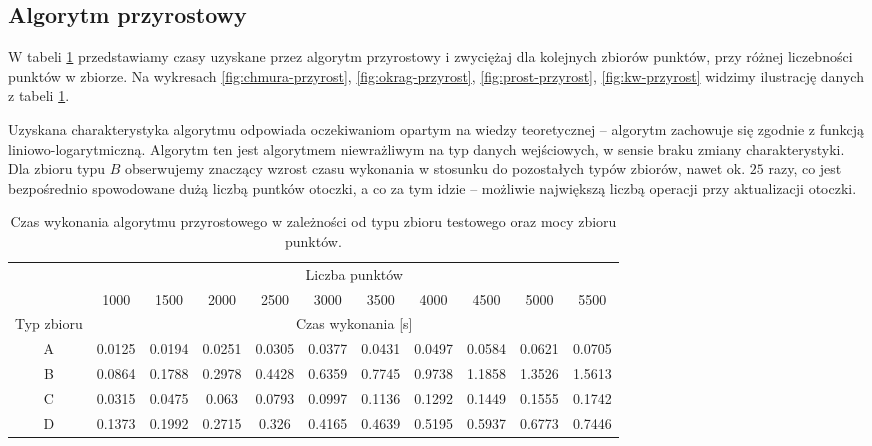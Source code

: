 \documentclass[11pt]{article}
\theoremstyle{remark} \newtheorem{definition}{def.}
\theoremstyle{definition} \newtheorem{twierdzenie}{tw.}
\begin{document}
\subsection{Algorytm przyrostowy}


W tabeli \ref{tab:przyrost} przedstawiamy czasy uzyskane przez algorytm przyrostowy i zwyciężaj dla kolejnych zbiorów punktów, przy różnej liczebności punktów w zbiorze. Na wykresach \ref{fig:chmura-przyrost}, 
\ref{fig:okrag-przyrost}, \ref{fig:prost-przyrost}, \ref{fig:kw-przyrost} widzimy ilustrację danych z tabeli \ref{tab:przyrost}.


Uzyskana charakterystyka algorytmu odpowiada oczekiwaniom opartym na wiedzy teoretycznej -- algorytm zachowuje się zgodnie z funkcją liniowo-logarytmiczną. 
Algorytm ten jest algorytmem niewrażliwym na typ danych wejściowych, w sensie braku zmiany charakterystyki. Dla zbioru typu
$B$ obserwujemy znaczący wzrost czasu wykonania w stosunku do pozostałych typów zbiorów, nawet ok. $25$ razy, co jest bezpośrednio spowodowane dużą liczbą puntków otoczki, a co za tym idzie -- możliwie 
największą liczbą operacji przy aktualizacji otoczki. 


\begin{table}[]
\centering
\caption{Czas wykonania algorytmu przyrostowego w zależności od typu zbioru testowego oraz mocy zbioru punktów.}
\label{tab:przyrost}
\begin{tabular}{c|c|c|c|c|c|c|c|c|c|c|}
\cline{2-11}
\multicolumn{1}{l|}{} & \multicolumn{10}{c|}{Liczba punktów} \\ \cline{2-11} 
\multicolumn{1}{l|}{} & 1000 & 1500 & 2000 & 2500 & 3000 & 3500 & 4000 & 4500 & 5000 & 5500 \\ \hline
\multicolumn{1}{|c|}{Typ zbioru} & \multicolumn{10}{c|}{Czas wykonania {[}s{]}} \\ \hline
\multicolumn{1}{|c|}{A} & 0.0125 & 0.0194 & 0.0251 & 0.0305 & 0.0377 & 0.0431 & 0.0497 & 0.0584 & 0.0621 & 0.0705 \\ \hline
\multicolumn{1}{|c|}{B} & 0.0864 & 0.1788 & 0.2978 & 0.4428 & 0.6359 & 0.7745 & 0.9738 & 1.1858 & 1.3526 & 1.5613 \\ \hline
\multicolumn{1}{|c|}{C} & 0.0315 & 0.0475 & 0.063 & 0.0793 & 0.0997 & 0.1136 & 0.1292 & 0.1449 & 0.1555 & 0.1742 \\ \hline
\multicolumn{1}{|c|}{D} & 0.1373 & 0.1992 & 0.2715 & 0.326 & 0.4165 & 0.4639 & 0.5195 & 0.5937 & 0.6773 & 0.7446 \\ \hline
\end{tabular}
\end{table}
\end{document}
